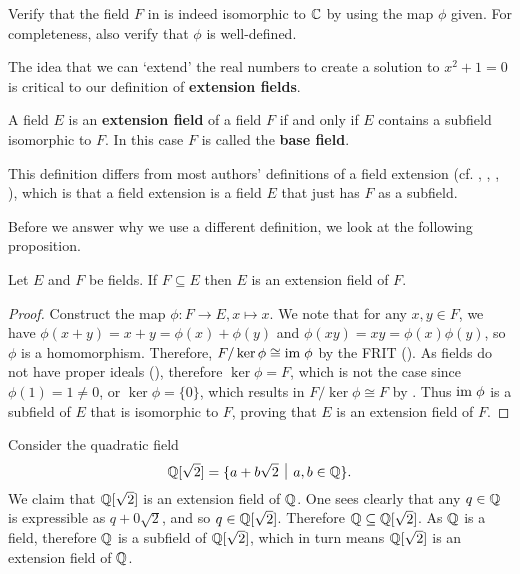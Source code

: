 \begin{exercise}
    Verify that the field $F$ in  is indeed isomorphic to $\mathbb{C}$ by using the map $\phi$ given. For completeness, also verify that $\phi$ is well-defined.
\end{exercise}

The idea that we can `extend' the real numbers to create a solution to $x^2 + 1 = 0$ is critical to our definition of \textbf{extension fields}.

\begin{definition}
    A field $E$ is an \textbf{extension field} of a field $F$ if and only if $E$ contains a subfield isomorphic to $F$. In this case $F$ is called the \textbf{base field}.
\end{definition}
\begin{remark}
    This definition differs from most authors' definitions of a field extension (cf. \cite[p.~511]{dummit_foote_2004}, \cite[p.~442]{artin_2011}, \cite[p.~338]{gallian_2016}, \cite[p.~260]{judson_beezer_2022}), which is that a field extension is a field $E$ that just has $F$ as a subfield.
\end{remark}

Before we answer why we use a different definition, we look at the following proposition.

\begin{proposition}
    Let $E$ and $F$ be fields. If $F \subseteq E$ then $E$ is an extension field of $F$.
\end{proposition}
\begin{proof}
    Construct the map $\phi: F \to E, x \mapsto x$. We note that for any $x,y\in F$, we have $\phi(x + y) = x + y = \phi(x) + \phi(y)$ and $\phi(xy) = xy = \phi(x)\phi(y)$, so $\phi$ is a homomorphism. Therefore, $F/\ker\phi \cong \mathrm{im}\;\phi$ by the FRIT (). As fields do not have proper ideals (), therefore $\ker\phi = F$, which is not the case since $\phi(1) = 1 \neq 0$, or $\ker\phi = \{0\}$, which results in $F/\ker\phi \cong F$ by . Thus $\mathrm{im}\;\phi$ is a subfield of $E$ that is isomorphic to $F$, proving that $E$ is an extension field of $F$.
\end{proof}

\begin{example}
    Consider the quadratic field
    \[
        \Q[\sqrt{2}] = \{a + b\sqrt{2} \vert a,b\in\Q\}.
    \]
    We claim that $\mathbb{Q}[\sqrt{2}]$ is an extension field of $\mathbb{Q}$. One sees clearly that any $q \in \mathbb{Q}$ is expressible as $q + 0\sqrt{2}$, and so $q \in \mathbb{Q}[\sqrt2]$. Therefore $\mathbb{Q} \subseteq \mathbb{Q}[\sqrt2]$. As $\mathbb{Q}$ is a field, therefore $\mathbb{Q}$ is a subfield of $\mathbb{Q}[\sqrt2]$, which in turn means $\mathbb{Q}[\sqrt2]$ is an extension field of $\mathbb{Q}$.
\end{example}

